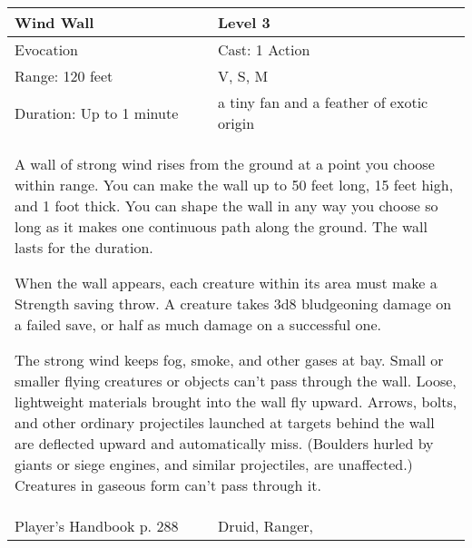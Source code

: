 \documentclass[11pt]{report}
\begin{document}
\begin{table}[H]
	\begin{tabular}{||p{6cm}|p{6cm}||}
		\hline\hline
		\bf{Wind Wall} & Level 3\\ \hline
		Evocation & Cast: 1 Action\\ \hline
		Range: 120 feet & V, S, M\\ \hline
		Duration: Up to 1 minute & a tiny fan and a feather of exotic origin\\ \hline
		\multicolumn{2}{||p{12cm}||}{A wall of strong wind rises from the ground at a point you choose within range.
You can make the wall up to 50 feet long, 15 feet high, and 1 foot thick. You can shape the wall in any way you choose so long as it makes one continuous path along the ground. The wall lasts for the duration.

When the wall appears, each creature within its area must make a Strength saving throw. A creature takes 3d8 bludgeoning damage on a failed save, or half as much damage on a successful one.

The strong wind keeps fog, smoke, and other gases at bay. Small or smaller flying creatures or objects can’t pass through the wall. Loose, lightweight materials brought into the wall fly upward. Arrows, bolts, and other ordinary projectiles launched at targets behind the wall are deflected upward and automatically miss. (Boulders hurled by giants or siege engines, and similar projectiles, are unaffected.) Creatures in gaseous form can’t pass through it.}\\ \hline
Player's Handbook p. 288 & Druid, Ranger, \\ \hline\hline
	\end{tabular}
\end{table}
\end{document}
